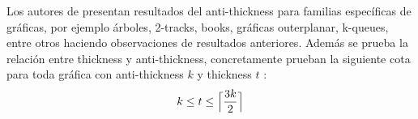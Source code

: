 
%
%

%
Los autores de \cite{Dujmovic2017} presentan resultados
del anti-thickness para familias específicas de gráficas, por ejemplo árboles, 2-tracks, books, gráficas
outerplanar, k-queues, entre otros haciendo observaciones de resultados anteriores.
Además se prueba la relación entre thickness y anti-thickness, concretamente prueban
la siguiente cota para toda gráfica con anti-thickness $k$ y thickness $t$
: \[ k \leq t \leq \Bigl\lceil \frac{3k}{2}\Bigr\rceil \]


